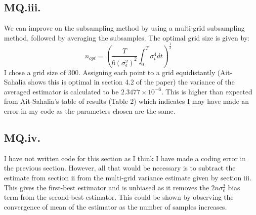 \documentclass[11pt]{article} %
\begin{document}
\subsection{MQ.iii.}
We can improve on the subsampling method by using a multi-grid subsampling method, followed by averaging the subsamples. The optimal grid size  is given by:
\begin{equation}
	n_{opt} = \left( \frac{T}{6(\sigma^{2}_{\epsilon})^{2}}\int^{T}_{0}\sigma^{4}_{t}dt\right)^{\frac{1}{3}}
\end{equation}
I chose a grid size of 300. Assigning each point to a grid equidistantly (Ait-Sahalia shows this is optimal in section 4.2 of the paper) the variance of the averaged estimator is calculated to be $2.3477\times 10^{-6}$. This is higher than expected from Ait-Sahalia's table of results (Table 2) which indicates I may have made an error in my code as the parameters chosen are the same.

\subsection{MQ.iv.}
I have not written code for this section as I think I have made a coding error in the previous section. However, all that would be necessary is to subtract the estimate from section ii from the multi-grid variance estimate given by section iii. This gives the first-best estimator and is unbiased as it removes the $2n\sigma^{2}_{\epsilon}$ bias term from the second-best estimator. This could be shown by observing the convergence of mean of the estimator as the number of samples increases.
\end{document}
